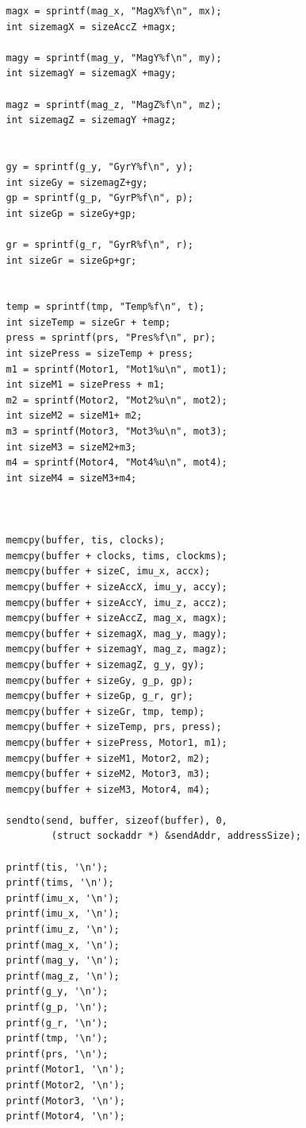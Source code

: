 \documentclass{article}
\begin{document}
\begin{enumerate}
\begin{verbatim}
                magx = sprintf(mag_x, "MagX%f\n", mx);
                int sizemagX = sizeAccZ +magx;

                magy = sprintf(mag_y, "MagY%f\n", my);
                int sizemagY = sizemagX +magy;

                magz = sprintf(mag_z, "MagZ%f\n", mz);
                int sizemagZ = sizemagY +magz;


                gy = sprintf(g_y, "GyrY%f\n", y);
                int sizeGy = sizemagZ+gy;
                gp = sprintf(g_p, "GyrP%f\n", p);
                int sizeGp = sizeGy+gp;

                gr = sprintf(g_r, "GyrR%f\n", r);
                int sizeGr = sizeGp+gr;


                temp = sprintf(tmp, "Temp%f\n", t);
                int sizeTemp = sizeGr + temp;
                press = sprintf(prs, "Pres%f\n", pr);
                int sizePress = sizeTemp + press;
                m1 = sprintf(Motor1, "Mot1%u\n", mot1);
                int sizeM1 = sizePress + m1;
                m2 = sprintf(Motor2, "Mot2%u\n", mot2);
                int sizeM2 = sizeM1+ m2;
                m3 = sprintf(Motor3, "Mot3%u\n", mot3);
                int sizeM3 = sizeM2+m3;
                m4 = sprintf(Motor4, "Mot4%u\n", mot4);
                int sizeM4 = sizeM3+m4;



                memcpy(buffer, tis, clocks);
                memcpy(buffer + clocks, tims, clockms);
                memcpy(buffer + sizeC, imu_x, accx);
                memcpy(buffer + sizeAccX, imu_y, accy);
                memcpy(buffer + sizeAccY, imu_z, accz);
                memcpy(buffer + sizeAccZ, mag_x, magx);
                memcpy(buffer + sizemagX, mag_y, magy);
                memcpy(buffer + sizemagY, mag_z, magz);
                memcpy(buffer + sizemagZ, g_y, gy);
                memcpy(buffer + sizeGy, g_p, gp);
                memcpy(buffer + sizeGp, g_r, gr);
                memcpy(buffer + sizeGr, tmp, temp);
                memcpy(buffer + sizeTemp, prs, press);
                memcpy(buffer + sizePress, Motor1, m1);
                memcpy(buffer + sizeM1, Motor2, m2);
                memcpy(buffer + sizeM2, Motor3, m3);
                memcpy(buffer + sizeM3, Motor4, m4);

                sendto(send, buffer, sizeof(buffer), 0,
                        (struct sockaddr *) &sendAddr, addressSize);

                printf(tis, '\n');
                printf(tims, '\n');
                printf(imu_x, '\n');
                printf(imu_x, '\n');
                printf(imu_z, '\n');
                printf(mag_x, '\n');
                printf(mag_y, '\n');
                printf(mag_z, '\n');
                printf(g_y, '\n');
                printf(g_p, '\n');
                printf(g_r, '\n');
                printf(tmp, '\n');
                printf(prs, '\n');
                printf(Motor1, '\n');
                printf(Motor2, '\n');
                printf(Motor3, '\n');
                printf(Motor4, '\n');



\end{verbatim}
\end{enumerate}
\end{document}
